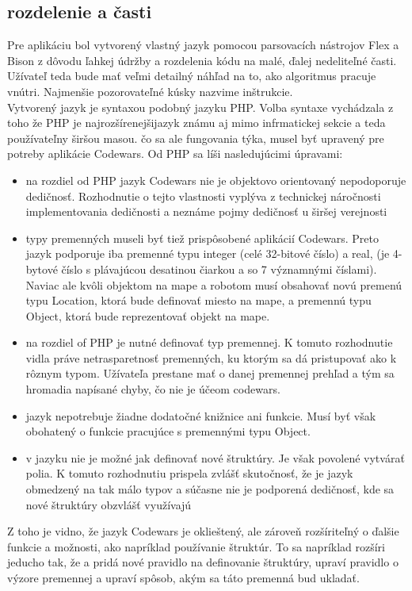 \subsection{rozdelenie a časti}
Pre aplikáciu bol vytvorený vlastný jazyk pomocou parsovacích nástrojov Flex a Bison z dôvodu ľahkej údržby a rozdelenia kódu na malé, ďalej nedeliteľné časti. Užívateľ teda bude mať veľmi detailný náhľad na to, ako algoritmus pracuje vnútri. Najmenšie pozorovateľné kúsky nazvime inštrukcie.\\
Vytvorený jazyk je syntaxou podobný jazyku PHP. Volba syntaxe vychádzala z toho že PHP je najrozšírenejšijazyk známu aj mimo infrmatickej sekcie a teda používateľny širšou masou. čo sa ale fungovania týka, musel byť upravený pre potreby aplikácie Codewars. Od PHP sa líši nasledujúcimi úpravami:
\begin{itemize}
\item na rozdiel od PHP jazyk Codewars nie je objektovo orientovaný nepodoporuje dedičnosť. Rozhodnutie o tejto vlastnosti vyplýva z technickej náročnosti implementovania dedičnosti a neznáme pojmy dedičnosť u širšej verejnosti
\item typy premenných museli byť tiež prispôsobené aplikácií Codewars. Preto jazyk podporuje iba premenné typu integer (celé 32-bitové číslo) a real, (je 4-bytové  číslo s plávajúcou desatinou čiarkou a so 7 významnými číslami). Naviac ale kvôli objektom na mape a robotom musí obsahovať novú premenú typu Location, ktorá bude definovať miesto na mape, a premennú typu Object, ktorá bude reprezentovať objekt na mape.
\item na rozdiel of PHP je nutné definovať typ premennej. K tomuto rozhodnutie vidla práve netrasparetnosť premenných, ku ktorým sa dá pristupovať ako k rôznym typom. Užívateľa prestane mať o danej premennej prehľad a tým sa hromadia napísané chyby, čo nie je účeom codewars.
\item jazyk nepotrebuje žiadne dodatočné knižnice ani funkcie. Musí byť však obohatený o funkcie pracujúce s premennými typu Object.
\item v jazyku nie je možné jak definovať nové štruktúry. Je však povolené vytvárať polia. K tomuto rozhodnutiu prispela zvlášť skutočnosť, že je jazyk obmedzený na tak málo typov a súčasne nie je podporená dedičnosť, kde sa nové štruktúry obzvlášť využívajú 
\end{itemize}
Z toho je vidno, že jazyk Codewars je oklieštený, ale zároveň rozšíriteľný o ďalšie funkcie a možnosti, ako napríklad používanie štruktúr. To sa napríklad rozšíri jeducho tak, že a pridá nové pravidlo na definovanie štruktúry, upraví pravidlo o výzore premennej a upraví spôsob, akým sa táto premenná bud ukladať.%
